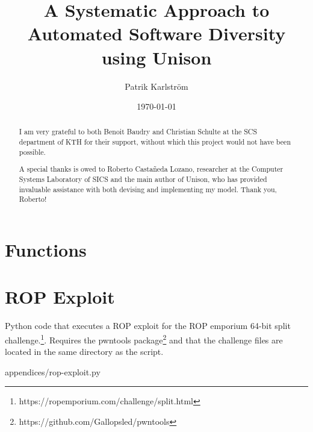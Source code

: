 \documentclass{kththesis}
\title{A Systematic Approach to Automated Software Diversity using Unison}
\author{Patrik Karlström}
\date{\today}
\begin{document}
\frontmatter

\titlepage





\renewcommand{\abstractname}{Acknowledgements}
\begin{abstract}
I am very grateful to both Benoit Baudry and Christian Schulte at the SCS department of
KTH for their support, without which this project would not have been possible.

A special thanks is owed to Roberto Castañeda Lozano, researcher at the Computer Systems
Laboratory of SICS and the main author of Unison, who has provided invaluable assistance
with both devising and implementing my model. Thank you, Roberto!
\end{abstract}


\tableofcontents


\mainmatter











\printbibliography[heading=bibintoc] %

\appendix

\chapter{Functions}
\label{appendix:function_names}


\chapter{ROP Exploit}
\label{appendix:rop-exploit}

Python code that executes a ROP exploit for the ROP emporium 64-bit split challenge.\footnote{https://ropemporium.com/challenge/split.html}.
Requires the pwntools package\footnote{https://github.com/Gallopsled/pwntools} and that
the challenge files are located in the same directory as the script.


{appendices/rop-exploit.py}
\end{document}
